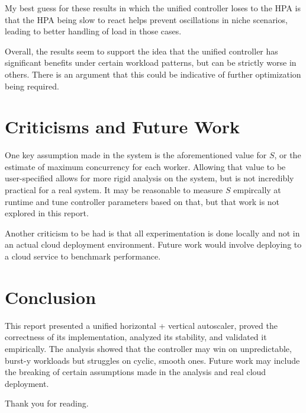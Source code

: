 \documentclass[twocolumn]{article}
\begin{document}
My best guess for these results in which the unified controller loses to the HPA is that the HPA being slow to react helps prevent oscillations in niche scenarios, leading to better handling of load in those cases.

Overall, the results seem to support the idea that the unified controller has significant benefits under certain workload patterns, but can be strictly worse in others. There is an argument that this could be indicative of further optimization being required.
\section{Criticisms and Future Work}
\label{sec:orgb19dcb0}

One key assumption made in the system is the aforementioned value for \(S\), or the estimate of maximum concurrency for each worker. Allowing that value to be user-specified allows for more rigid analysis on the system, but is not incredibly practical for a real system. It may be reasonable to measure \(S\) empircally at runtime and tune controller parameters based on that, but that work is not explored in this report.

Another criticism to be had is that all experimentation is done locally and not in an actual cloud deployment environment. Future work would involve deploying to a cloud service to benchmark performance.
\section{Conclusion}
\label{sec:org30260a8}

This report presented a unified horizontal + vertical autoscaler, proved the correctness of its implementation, analyzed its stability, and validated it empirically. The analysis showed that the controller may win on unpredictable, burst-y workloads but struggles on cyclic, smooth ones. Future work may include the breaking of certain assumptions made in the analysis and real cloud deployment.

Thank you for reading.
\end{document}
